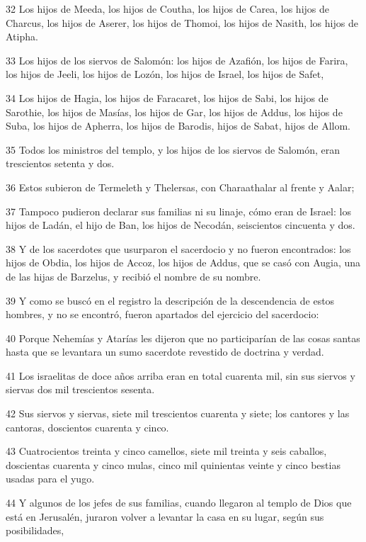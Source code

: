 \par 32 Los hijos de Meeda, los hijos de Coutha, los hijos de Carea, los hijos de Charcus, los hijos de Aserer, los hijos de Thomoi, los hijos de Nasith, los hijos de Atipha.
\par 33 Los hijos de los siervos de Salomón: los hijos de Azafión, los hijos de Farira, los hijos de Jeeli, los hijos de Lozón, los hijos de Israel, los hijos de Safet,
\par 34 Los hijos de Hagia, los hijos de Faracaret, los hijos de Sabi, los hijos de Sarothie, los hijos de Masías, los hijos de Gar, los hijos de Addus, los hijos de Suba, los hijos de Apherra, los hijos de Barodis, hijos de Sabat, hijos de Allom.
\par 35 Todos los ministros del templo, y los hijos de los siervos de Salomón, eran trescientos setenta y dos.
\par 36 Estos subieron de Termeleth y Thelersas, con Charaathalar al frente y Aalar;
\par 37 Tampoco pudieron declarar sus familias ni su linaje, cómo eran de Israel: los hijos de Ladán, el hijo de Ban, los hijos de Necodán, seiscientos cincuenta y dos.
\par 38 Y de los sacerdotes que usurparon el sacerdocio y no fueron encontrados: los hijos de Obdia, los hijos de Accoz, los hijos de Addus, que se casó con Augia, una de las hijas de Barzelus, y recibió el nombre de su nombre.
\par 39 Y como se buscó en el registro la descripción de la descendencia de estos hombres, y no se encontró, fueron apartados del ejercicio del sacerdocio:
\par 40 Porque Nehemías y Atarías les dijeron que no participarían de las cosas santas hasta que se levantara un sumo sacerdote revestido de doctrina y verdad.
\par 41 Los israelitas de doce años arriba eran en total cuarenta mil, sin sus siervos y siervas dos mil trescientos sesenta.
\par 42 Sus siervos y siervas, siete mil trescientos cuarenta y siete; los cantores y las cantoras, doscientos cuarenta y cinco.
\par 43 Cuatrocientos treinta y cinco camellos, siete mil treinta y seis caballos, doscientas cuarenta y cinco mulas, cinco mil quinientas veinte y cinco bestias usadas para el yugo.
\par 44 Y algunos de los jefes de sus familias, cuando llegaron al templo de Dios que está en Jerusalén, juraron volver a levantar la casa en su lugar, según sus posibilidades,
